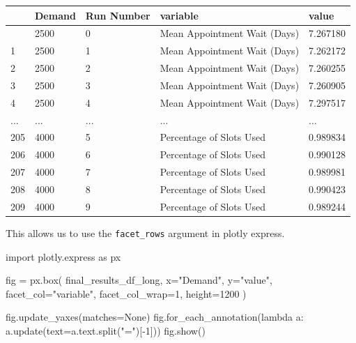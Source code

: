 \documentclass[
  letterpaper,
  DIV=11,
  numbers=noendperiod]{scrreprt}
\newenvironment{Shaded}{\begin{snugshade}}{\end{snugshade}}
\newcommand{\DecValTok}[1]{\textcolor[rgb]{0.68,0.00,0.00}{#1}}
\newcommand{\ImportTok}[1]{\textcolor[rgb]{0.00,0.46,0.62}{#1}}
\newcommand{\KeywordTok}[1]{\textcolor[rgb]{0.00,0.23,0.31}{#1}}
\newcommand{\NormalTok}[1]{\textcolor[rgb]{0.00,0.23,0.31}{#1}}
\newcommand{\OperatorTok}[1]{\textcolor[rgb]{0.37,0.37,0.37}{#1}}
\newcommand{\StringTok}[1]{\textcolor[rgb]{0.13,0.47,0.30}{#1}}
\newcommand{\VariableTok}[1]{\textcolor[rgb]{0.07,0.07,0.07}{#1}}
\begin{document}
\begin{longtable}[]{@{}lllll@{}}
\toprule\noalign{}
& Demand & Run Number & variable & value \\
\midrule\noalign{}
\endhead
\bottomrule\noalign{}
\endlastfoot
0 & 2500 & 0 & Mean Appointment Wait (Days) & 7.267180 \\
1 & 2500 & 1 & Mean Appointment Wait (Days) & 7.262172 \\
2 & 2500 & 2 & Mean Appointment Wait (Days) & 7.260255 \\
3 & 2500 & 3 & Mean Appointment Wait (Days) & 7.260905 \\
4 & 2500 & 4 & Mean Appointment Wait (Days) & 7.297517 \\
... & ... & ... & ... & ... \\
205 & 4000 & 5 & Percentage of Slots Used & 0.989834 \\
206 & 4000 & 6 & Percentage of Slots Used & 0.990128 \\
207 & 4000 & 7 & Percentage of Slots Used & 0.989981 \\
208 & 4000 & 8 & Percentage of Slots Used & 0.990423 \\
209 & 4000 & 9 & Percentage of Slots Used & 0.989244 \\
\end{longtable}

This allows us to use the \texttt{facet\_rows} argument in plotly
express.

\begin{Shaded}
\begin{Highlighting}[]
\ImportTok{import}\NormalTok{ plotly.express }\ImportTok{as}\NormalTok{ px}

\NormalTok{fig }\OperatorTok{=}\NormalTok{ px.box(}
\NormalTok{  final\_results\_df\_long,}
\NormalTok{  x}\OperatorTok{=}\StringTok{"Demand"}\NormalTok{,}
\NormalTok{  y}\OperatorTok{=}\StringTok{"value"}\NormalTok{,}
\NormalTok{  facet\_col}\OperatorTok{=}\StringTok{"variable"}\NormalTok{,}
\NormalTok{  facet\_col\_wrap}\OperatorTok{=}\DecValTok{1}\NormalTok{,}
\NormalTok{  height}\OperatorTok{=}\DecValTok{1200}
\NormalTok{)}

\NormalTok{fig.update\_yaxes(matches}\OperatorTok{=}\VariableTok{None}\NormalTok{)}
\NormalTok{fig.for\_each\_annotation(}\KeywordTok{lambda}\NormalTok{ a: a.update(text}\OperatorTok{=}\NormalTok{a.text.split(}\StringTok{"="}\NormalTok{)[}\OperatorTok{{-}}\DecValTok{1}\NormalTok{]))}
\NormalTok{fig.show()}
\end{Highlighting}
\end{Shaded}
\end{document}
